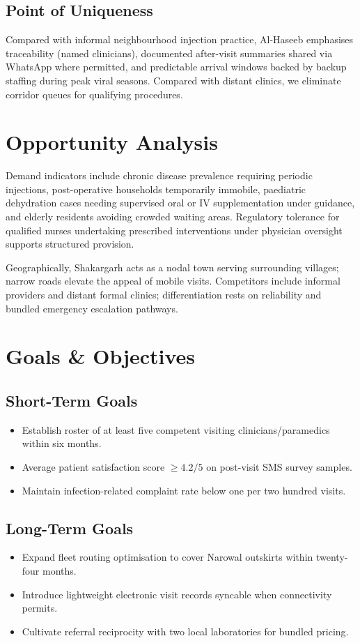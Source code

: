 \documentclass[12pt,a4paper]{report}
\begin{document}
\section{Point of Uniqueness}
Compared with informal neighbourhood injection practice, Al-Haseeb emphasises traceability (named clinicians), documented after-visit summaries shared via WhatsApp where permitted, and predictable arrival windows backed by backup staffing during peak viral seasons. Compared with distant clinics, we eliminate corridor queues for qualifying procedures.

\chapter{Opportunity Analysis}

Demand indicators include chronic disease prevalence requiring periodic injections, post-operative households temporarily immobile, paediatric dehydration cases needing supervised oral or IV supplementation under guidance, and elderly residents avoiding crowded waiting areas. Regulatory tolerance for qualified nurses undertaking prescribed interventions under physician oversight supports structured provision.

Geographically, Shakargarh acts as a nodal town serving surrounding villages; narrow roads elevate the appeal of mobile visits. Competitors include informal providers and distant formal clinics; differentiation rests on reliability and bundled emergency escalation pathways.

\chapter{Goals \& Objectives}

\section{Short-Term Goals}
\begin{itemize}
  \item Establish roster of at least five competent visiting clinicians/paramedics within six months.
  \item Average patient satisfaction score $\geq 4.2/5$ on post-visit SMS survey samples.
  \item Maintain infection-related complaint rate below one per two hundred visits.
\end{itemize}

\section{Long-Term Goals}
\begin{itemize}
  \item Expand fleet routing optimisation to cover Narowal outskirts within twenty-four months.
  \item Introduce lightweight electronic visit records syncable when connectivity permits.
  \item Cultivate referral reciprocity with two local laboratories for bundled pricing.
\end{itemize}
\end{document}
